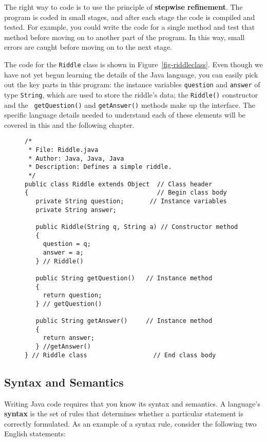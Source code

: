 The right way to code is to use the principle of {\bf stepwise refinement}. 
The program is coded in small stages, and after each stage the code is
compiled and tested.  For example, you could write the code for a
single method and test that method before moving on to another part of
the program. In this way, small errors are caught before moving on to
the next stage.

The code for the {\tt Riddle} class is shown in
Figure~\ref{fig-riddleclass}. Even though we have not yet begun
learning the details of the Java language, you can easily pick out the
key parts in this program: the instance variables {\tt question} and
{\tt answer} of type {\tt String}, which are used to store the
riddle's data; the {\tt Riddle()} constructor and the {\tt
getQuestion()} and {\tt getAnswer()} methods make up the interface.
The specific language details needed to understand each of these
elements will be covered in this and the following chapter.

\begin{figure}[tb]
\jjjprogstart
\begin{jjjlisting}
\begin{lstlisting}
/*
 * File: Riddle.java
 * Author: Java, Java, Java
 * Description: Defines a simple riddle.
 */
public class Riddle extends Object  // Class header
{                                   // Begin class body
   private String question;       // Instance variables
   private String answer;

   public Riddle(String q, String a) // Constructor method
   {
     question = q;
     answer = a;
   } // Riddle()

   public String getQuestion()   // Instance method
   {
     return question;
   } // getQuestion()

   public String getAnswer()     // Instance method
   {
     return answer;
   } //getAnswer()
} // Riddle class                  // End class body
\end{lstlisting}
\end{jjjlisting}
\end{figure}

\subsection{Syntax and Semantics}
\noindent Writing Java code requires that you know its syntax and 
semantics.  A language's {\bf syntax} is the set of rules
that determines whether a particular statement is correctly
formulated.  As an example of a syntax rule, consider the following
two English statements:


